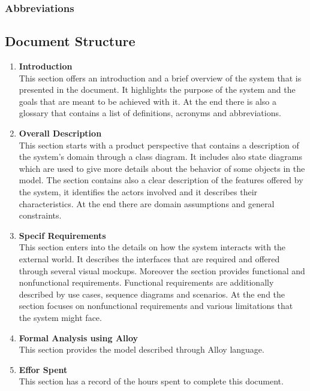 \subsubsection{Abbreviations}

\subsection{Document Structure}
\begin{enumerate}
    \item \textbf{Introduction}\\
            This section offers an introduction and a brief overview of the system that is presented in the document. 
            It highlights the purpose of the system and the goals that are meant to be achieved with it. 
            At the end there is also a glossary that contains a list of definitions, acronyms and abbreviations.
            
    \item \textbf{Overall Description}\\
            This section starts with a product perspective that contains a description of the system's domain through a class diagram. 
            It includes also state diagrams which are used to give more details about the behavior of some objects in the model.
            The section contains also a clear description of the features offered by the system, 
            it identifies the actors involved and it describes their characteristics.
            At the end there are domain assumptions and general constraints.
            
    
    \item \textbf{Specif Requirements}\\
            This section enters into the details on how the system interacts with the external world. It describes 
            the interfaces that are required and offered through several visual mockups. 
            Moreover the section provides functional and nonfunctional requirements. Functional
            requirements are additionally described by use cases, sequence diagrams and scenarios.
            At the end the section focuses on nonfunctional requirements and various limitations that the system might face.

    \item \textbf{Formal Analysis using Alloy}\\
            This section provides the model described through Alloy language.
            
    \item \textbf{Effor Spent}\\
            This section has a record of the hours spent to complete this document.

\end{enumerate}


